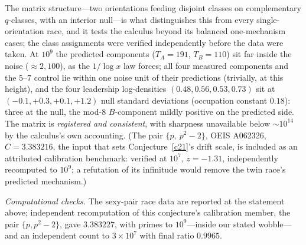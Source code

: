 \documentclass[11pt]{article}
\theoremstyle{definition}
\begin{document}
The matrix structure---two orientations feeding disjoint classes on
complementary $q$-classes, with an interior null---is what
distinguishes this from every single-orientation race, and it tests
the calculus beyond its balanced one-mechanism cases; the class
assignments were verified independently before the data were taken.
At $10^9$ the predicted components ($T_A=191$, $T_B=110$) sit far
inside the noise ($\approx2{,}100$), as the $1/\log x$ law forces;
all four measured components and the $5$--$7$ control lie within one
noise unit of their predictions (trivially, at this height), and the
four leadership log-densities $(0.48,0.56,0.53,0.73)$ sit at
$(-0.1,+0.3,+0.1,+1.2)$ null standard deviations
(occupation constant $0.18$): three at the null, the mod-8
$B$-component mildly positive on the predicted side.  The
matrix is \emph{registered and consistent}, with sharpness
unavailable below ${\sim}10^{14}$ by the calculus's own accounting.
(The pair $\{p,\ p^2-2\}$, OEIS A062326, $C=3.383216$, the input that
sets Conjecture~\ref{c21}'s drift scale, is included as an attributed
calibration benchmark: verified at
$10^7$, $z=-1.31$, independently recomputed to $10^9$; a refutation
of its infinitude would remove the twin race's predicted mechanism.)

\emph{Computational checks.}  The sexy-pair race data are reported at the
statement above; independent recomputation of this conjecture's
calibration member, the pair $\{p,p^2-2\}$, gave $3.383227$, with
primes to $10^9$---inside our stated wobble---and an independent count
to $3\times10^7$ with final ratio $0.9965$.
\end{document}
